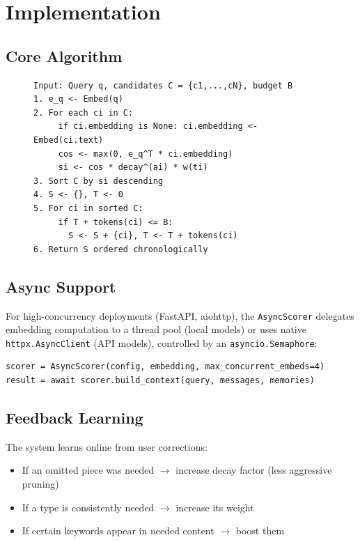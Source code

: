\documentclass[11pt,a4paper]{article}
\begin{document}
\section{Implementation}
\label{sec:implementation}

\subsection{Core Algorithm}

\begin{figure}[H]
\begin{lstlisting}[caption={Adaptive Context Selection},label={alg:select},language={}]
Input: Query q, candidates C = {c1,...,cN}, budget B
1. e_q <- Embed(q)
2. For each ci in C:
     if ci.embedding is None: ci.embedding <- Embed(ci.text)
     cos <- max(0, e_q^T * ci.embedding)
     si <- cos * decay^(ai) * w(ti)
3. Sort C by si descending
4. S <- {}, T <- 0
5. For ci in sorted C:
     if T + tokens(ci) <= B:
       S <- S + {ci}, T <- T + tokens(ci)
6. Return S ordered chronologically
\end{lstlisting}
\end{figure}

\subsection{Async Support}

For high-concurrency deployments (FastAPI, aiohttp), the \texttt{AsyncScorer}
delegates embedding computation to a thread pool (local models) or uses native
\texttt{httpx.AsyncClient} (API models), controlled by an \texttt{asyncio.Semaphore}:

\begin{lstlisting}
scorer = AsyncScorer(config, embedding, max_concurrent_embeds=4)
result = await scorer.build_context(query, messages, memories)
\end{lstlisting}

\subsection{Feedback Learning}

The system learns online from user corrections:
\begin{itemize}
    \item If an omitted piece was needed $\rightarrow$ increase decay factor (less aggressive pruning)
    \item If a type is consistently needed $\rightarrow$ increase its weight
    \item If certain keywords appear in needed content $\rightarrow$ boost them
\end{itemize}
\end{document}
